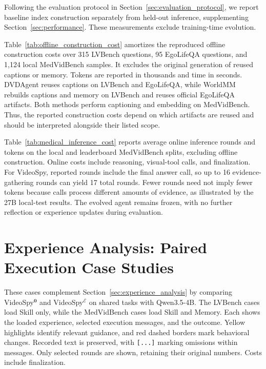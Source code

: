 Following the evaluation protocol in Section~\ref{sec:evaluation_protocol}, we report baseline index construction separately from held-out inference, supplementing Section~\ref{sec:performance}. These measurements exclude training-time evolution.

Table~\ref{tab:offline_construction_cost} amortizes the reproduced offline construction costs over 315 LVBench questions, 95 EgoLifeQA questions, and 1,124 local MedVidBench samples. It excludes the original generation of reused captions or memory. Tokens are reported in thousands and time in seconds. DVDAgent reuses captions on LVBench and EgoLifeQA, while WorldMM rebuilds captions and memory on LVBench and reuses official EgoLifeQA artifacts. Both methods perform captioning and embedding on MedVidBench. Thus, the reported construction costs depend on which artifacts are reused and should be interpreted alongside their listed scope.

\VideoSpyOfflineCostTable

Table~\ref{tab:medical_inference_cost} reports average online inference rounds and tokens on the local and leaderboard MedVidBench splits, excluding offline construction. Online costs include reasoning, visual-tool calls, and finalization. For VideoSpy, reported rounds include the final answer call, so up to 16 evidence-gathering rounds can yield 17 total rounds. Fewer rounds need not imply fewer tokens because calls process different amounts of evidence, as illustrated by the 27B local-test results. The evolved agent remains frozen, with no further reflection or experience updates during evaluation.

\VideoSpyMedicalCostTable

\noindent\begin{minipage}{\linewidth}
\section{Experience Analysis: Paired Execution Case Studies}
\label{app:experience_examples}
\label{app:behavior_examples}
\label{app:execution_cases}

These cases complement Section~\ref{sec:experience_analysis} by comparing VideoSpy$^{\mathbf{0}}$ and VideoSpy$^{\mathcal{E}}$ on shared tasks with Qwen3.5-4B. The LVBench cases load Skill only, while the MedVidBench cases load Skill and Memory. Each shows the loaded experience, selected execution messages, and the outcome. Yellow highlights identify relevant guidance, and red dashed borders mark behavioral changes. Recorded text is preserved, with \texttt{[...]} marking omissions within messages. Only selected rounds are shown, retaining their original numbers. Costs include finalization.
\end{minipage}
\par

